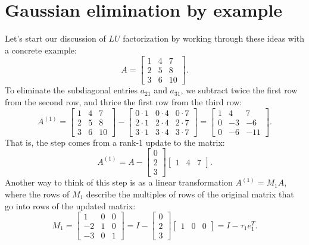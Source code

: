 \documentclass[12pt, leqno]{article} %
\begin{document}

\section{Gaussian elimination by example}

Let's start our discussion of $LU$ factorization by working through
these ideas with a concrete example:
\[
  A =
  \begin{bmatrix}
    1 & 4 & 7 \\
    2 & 5 & 8 \\
    3 & 6 & 10
  \end{bmatrix}.
\]
To eliminate the subdiagonal entries $a_{21}$ and $a_{31}$, we
subtract twice the first row from the second row, and thrice the
first row from the third row:
\[
  A^{(1)} =
  \begin{bmatrix}
    1 & 4 & 7 \\
    2 & 5 & 8 \\
    3 & 6 & 10
  \end{bmatrix} -
  \begin{bmatrix}
    0 \cdot 1 & 0 \cdot 4 & 0 \cdot 7 \\
    2 \cdot 1 & 2 \cdot 4 & 2 \cdot 7 \\
    3 \cdot 1 & 3 \cdot 4 & 3 \cdot 7
  \end{bmatrix}
  =
  \begin{bmatrix}
    1 &  4 &  7 \\
    0 & -3 & -6 \\
    0 & -6 & -11
  \end{bmatrix}.
\]
That is, the step comes from a rank-1 update to the matrix:
\[
  A^{(1)} =
  A -
  \begin{bmatrix} 0 \\ 2 \\ 3 \end{bmatrix}
  \begin{bmatrix} 1 & 4 & 7 \end{bmatrix}.
\]
Another way to think of this step is as a linear transformation
$A^{(1)} = M_1 A$, where the rows of $M_1$ describe the multiples
of rows of the original matrix that go into rows of the updated matrix:
\[
  M_1 = \begin{bmatrix} 1 & 0 & 0 \\ -2 & 1 & 0 \\ -3 & 0 & 1 \end{bmatrix}
      = I - \begin{bmatrix} 0 \\ 2 \\ 3 \end{bmatrix}
            \begin{bmatrix} 1 & 0 & 0 \end{bmatrix}
      = I - \tau_1 e_1^T.
\]
\end{document}
